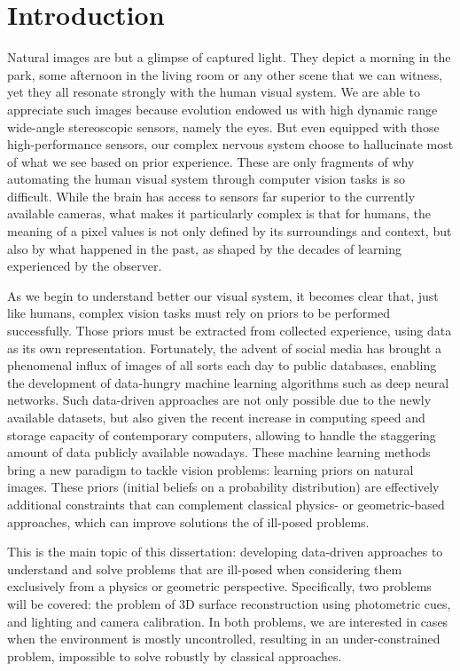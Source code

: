 \chapter*{Introduction}         %

Natural images are but a glimpse of captured light. They depict a morning in the park, some afternoon in the living room or any other scene that we can witness, yet they all resonate strongly with the human visual system. We are able to appreciate such images because evolution endowed us with high dynamic range wide-angle stereoscopic sensors, namely the eyes. But even equipped with those high-performance sensors, our complex nervous system choose to hallucinate most of what we see based on prior experience. These are only fragments of why automating the human visual system through computer vision tasks is so difficult. While the brain has access to sensors far superior to the currently available cameras, what makes it particularly complex is that for humans, the meaning of a pixel values is not only defined by its surroundings and context, but also by what happened in the past, as shaped by the decades of learning experienced by the observer.

As we begin to understand better our visual system, it becomes clear that, just like humans, complex vision tasks must rely on priors to be performed successfully. Those priors must be extracted from collected experience, using data as its own representation. Fortunately, the advent of social media has brought a phenomenal influx of images of all sorts each day to public databases, enabling the development of data-hungry machine learning algorithms such as deep neural networks. Such data-driven approaches are not only possible due to the newly available datasets, but also given the recent increase in computing speed and storage capacity of contemporary computers, allowing to handle the staggering amount of data publicly available nowadays. These machine learning methods bring a new paradigm to tackle vision problems: learning priors on natural images. These priors (initial beliefs on a probability distribution) are effectively additional constraints that can complement classical physics- or geometric-based approaches, which can improve solutions the of ill-posed problems.

This is the main topic of this dissertation: developing data-driven approaches to understand and solve problems that are ill-posed when considering them exclusively from a physics or geometric perspective. Specifically, two problems will be covered: the problem of 3D surface reconstruction using photometric cues, and lighting and camera calibration. In both problems, we are interested in cases when the environment is mostly uncontrolled, resulting in an under-constrained problem, impossible to solve robustly by classical approaches.

